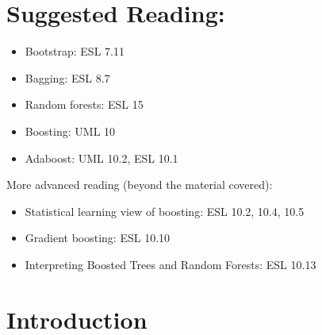 \section*{Suggested Reading:}
\begin{itemize}
  \item Bootstrap: ESL 7.11
  \item Bagging: ESL 8.7
  \item Random forests: ESL 15
  \item Boosting: UML 10
  \item Adaboost: UML 10.2, ESL 10.1

\end{itemize}

More advanced reading (beyond the material covered):
\begin{itemize}
  \item Statistical learning view of boosting: ESL 10.2, 10.4, 10.5
  \item Gradient boosting: ESL 10.10
  \item Interpreting Boosted Trees and Random Forests: ESL 10.13

\end{itemize}

\section{Introduction}


